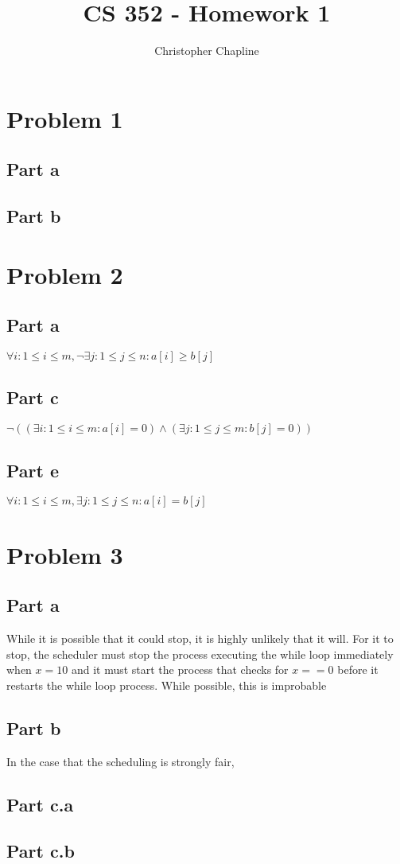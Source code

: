 \documentclass{article}%
\begin{document}
\title{CS 352 - Homework 1}
\author{Christopher Chapline}
\maketitle

\section{Problem 1}

\subsection{Part a}
\subsection{Part b}

\section{Problem 2}

\subsection{Part a}

$\forall i : 1 \leq i \leq m, \neg \exists j : 1 \leq j \leq n : a[i] \geq b[j]$

\subsection{Part c}

$\neg((\exists i : 1 \leq i \leq m : a[i] = 0) \wedge (\exists j : 1 \leq j \leq m : b[j] = 0))$

\subsection{Part e}

$\forall i : 1 \leq i \leq m, \exists j : 1 \leq j \leq n : a[i] = b[j]$

\section{Problem 3}

\subsection{Part a}

While it is possible that it could stop, it is highly unlikely that it will. For it to stop, the scheduler must stop the process executing the while
loop immediately when $x=10$ and it must start the process that checks for $x==0$ before it restarts the while loop process. While possible, this is
improbable

\subsection{Part b}

In the case that the scheduling is strongly fair,

\subsection{Part c.a}
\subsection{Part c.b}
\end{document}
